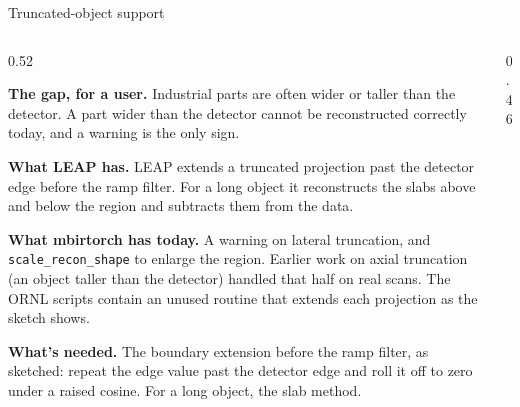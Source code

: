 \documentclass[aspectratio=169,10pt]{beamer}
\newcommand{\tagchip}[2]{{\setlength{\fboxsep}{2.5pt}\setlength{\fboxrule}{0.6pt}%
  \fcolorbox{white}{#1}{\textcolor{white}{\footnotesize\bfseries\strut #2}}}}
\newcommand{\leaprank}[1]{\tagchip{leapPurple}{LEAP #1}}
\newcommand{\tigrerank}[1]{\tagchip{tigreTeal}{TIGRE #1}}
\newcommand{\head}[1]{\textbf{#1}}
\begin{document}
\begin{frame}{Truncated-object support \hfill \leaprank{1}~\tigrerank{4}}
  \begin{columns}[T]
    \begin{column}{0.52\textwidth}
      {\footnotesize
      \head{The gap, for a user.}  Industrial parts are often wider or
      taller than the detector.  A part wider than the detector cannot be
      reconstructed correctly today, and a warning is the only
      sign.\par\vspace{5pt}
      \head{What LEAP has.}  LEAP extends a truncated projection past the
      detector edge before the ramp filter.  For a long object it
      reconstructs the slabs above and below the region and subtracts them
      from the data.\par\vspace{5pt}
      \head{What mbirtorch has today.}  A warning on lateral truncation, and
      \texttt{scale\_recon\_shape} to enlarge the region.  Earlier work on
      axial truncation (an object taller than the detector) handled that half
      on real scans.  The ORNL scripts contain an unused routine that extends
      each projection as the sketch shows.\par\vspace{5pt}
      \head{What's needed.}  The boundary extension before the ramp filter,
      as sketched: repeat the edge value past the detector edge and roll it
      off to zero under a raised cosine.  For a long object, the slab
      method.\par}
    \end{column}
    \begin{column}{0.46\textwidth}
      \centering
\end{column}
\end{columns}
\end{frame}
\end{document}
